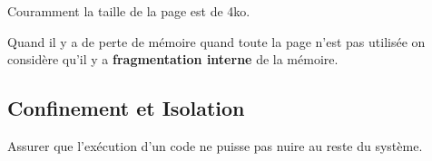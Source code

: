 \documentclass{article}
\begin{document}
\begin{definition}
\begin{figure}[H]
    \end{figure}

    \begin{remark}
        Couramment la taille de la page est de 4ko.
    \end{remark}
    Quand il y a de perte de mémoire quand toute la page n'est pas utilisée on considère qu'il y a \textbf{fragmentation interne} de la mémoire.
\end{definition}

\subsection{Confinement et Isolation}
\begin{definition}
    Assurer que l'exécution d'un code ne puisse pas nuire au reste du système.
\end{definition}
\end{document}
